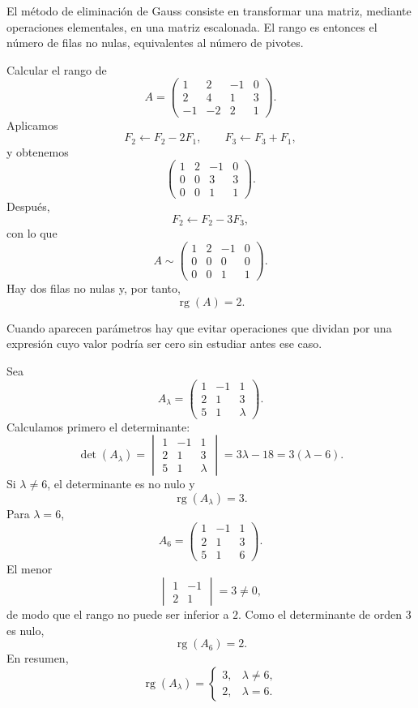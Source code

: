 El método de eliminación de Gauss consiste en transformar una matriz, mediante operaciones elementales, en una matriz escalonada. El rango es entonces el número de filas no nulas, equivalentes al número de pivotes.

\begin{example}
Calcular el rango de
\[
A=
\begin{pmatrix}
1&2&-1&0\\
2&4&1&3\\
-1&-2&2&1
\end{pmatrix}.
\]
Aplicamos
\[
F_2\leftarrow F_2-2F_1,
\qquad
F_3\leftarrow F_3+F_1,
\]
y obtenemos
\[
\begin{pmatrix}
1&2&-1&0\\
0&0&3&3\\
0&0&1&1
\end{pmatrix}.
\]
Después,
\[
F_2\leftarrow F_2-3F_3,
\]
con lo que
\[
A\sim
\begin{pmatrix}
1&2&-1&0\\
0&0&0&0\\
0&0&1&1
\end{pmatrix}.
\]
Hay dos filas no nulas y, por tanto,
\[
\boxed{\operatorname{rg}(A)=2.}
\]
\end{example}

Cuando aparecen parámetros hay que evitar operaciones que dividan por una expresión cuyo valor podría ser cero sin estudiar antes ese caso.

\begin{example}
Sea
\[
A_\lambda=
\begin{pmatrix}
1&-1&1\\
2&1&3\\
5&1&\lambda
\end{pmatrix}.
\]
Calculamos primero el determinante:
\[
\det(A_\lambda)
=
\begin{vmatrix}
1&-1&1\\
2&1&3\\
5&1&\lambda
\end{vmatrix}
=3\lambda-18=3(\lambda-6).
\]
Si $\lambda\neq6$, el determinante es no nulo y
\[
\operatorname{rg}(A_\lambda)=3.
\]
Para $\lambda=6$,
\[
A_6=
\begin{pmatrix}
1&-1&1\\
2&1&3\\
5&1&6
\end{pmatrix}.
\]
El menor
\[
\begin{vmatrix}1&-1\\2&1\end{vmatrix}=3\neq0,
\]
de modo que el rango no puede ser inferior a $2$. Como el determinante de orden $3$ es nulo,
\[
\boxed{\operatorname{rg}(A_6)=2.}
\]
En resumen,
\[
\operatorname{rg}(A_\lambda)=
\begin{cases}
3,&\lambda\neq6,\\
2,&\lambda=6.
\end{cases}
\]
\end{example}


